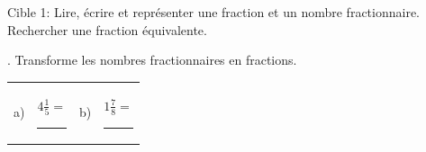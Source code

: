 \documentclass[11pt]{article}
\begin{document}
\begin{cible}{Cible 1: Lire, écrire et représenter une fraction et un nombre fractionnaire. Rechercher une fraction équivalente.}
  \vspace {25mm}

  . Transforme les nombres fractionnaires en fractions.

  \vspace{7mm}

  \begin{tabular}{@{}p{0.5cm}p{6cm}p{0.5cm}p{6cm}}
    a) & $4\frac{1}{5}=$\hspace{3mm}\rule{2cm}{0.4pt} & b) & $1\frac{7}{8}=$ \hspace{3mm}\rule{2cm}{0.4pt}
  \end{tabular}

  \vspace{25mm}

\end{cible}


\newpage

\end{document}
